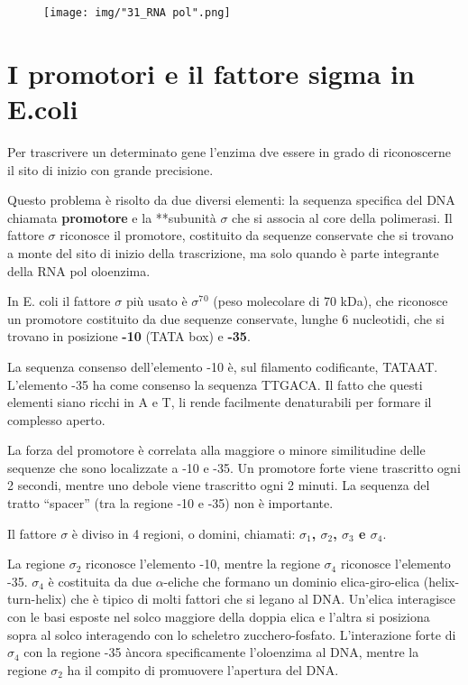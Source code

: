 \documentclass[11pt]{book}
\begin{document}
\begin{figure}[htp]
\centering
\texttt{[image: img/"31\_RNA pol".png]}
\caption{}
\label{rna-pol}
\end{figure}

\section{I promotori e il fattore sigma in
E.coli}\label{i-promotori-e-il-fattore-sigma-in-e.coli}

Per trascrivere un determinato gene l'enzima dve essere in grado di
riconoscerne il sito di inizio con grande precisione.

Questo problema è risolto da due diversi elementi: la sequenza specifica
del DNA chiamata \textbf{promotore} e la **subunità \(\sigma\) che si
associa al core della polimerasi. Il fattore \(\sigma\) riconosce il
promotore, costituito da sequenze conservate che si trovano a monte del
sito di inizio della trascrizione, ma solo quando è parte integrante
della RNA pol oloenzima.

In E. coli il fattore \(\sigma\) più usato è \(\sigma\)\(^7\)\(^0\)
(peso molecolare di 70 kDa), che riconosce un promotore costituito da
due sequenze conservate, lunghe 6 nucleotidi, che si trovano in
posizione \textbf{-10} (TATA box) e \textbf{-35}.

La sequenza consenso dell'elemento -10 è, sul filamento codificante,
TATAAT. L'elemento -35 ha come consenso la sequenza TTGACA. Il fatto che
questi elementi siano ricchi in A e T, li rende facilmente denaturabili
per formare il complesso aperto.

La forza del promotore è correlata alla maggiore o minore similitudine
delle sequenze che sono localizzate a -10 e -35. Un promotore forte
viene trascritto ogni 2 secondi, mentre uno debole viene trascritto ogni
2 minuti. La sequenza del tratto ``spacer'' (tra la regione -10 e -35)
non è importante.

Il fattore \(\sigma\) è diviso in 4 regioni, o domini, chiamati:
\textbf{\(\sigma\)\(_1\), \(\sigma\)\(_2\), \(\sigma\)\(_3\) e
\(\sigma\)\(_4\)}.

La regione \(\sigma\)\(_2\) riconosce l'elemento -10, mentre la regione
\(\sigma\)\(_4\) riconosce l'elemento -35. \(\sigma\)\(_4\) è costituita
da due \(\alpha\)-eliche che formano un dominio elica-giro-elica
(helix-turn-helix) che è tipico di molti fattori che si legano al DNA.
Un'elica interagisce con le basi esposte nel solco maggiore della doppia
elica e l'altra si posiziona sopra al solco interagendo con lo scheletro
zucchero-fosfato. L'interazione forte di \(\sigma\)\(_4\) con la regione
-35 àncora specificamente l'oloenzima al DNA, mentre la regione
\(\sigma\)\(_2\) ha il compito di promuovere l'apertura del DNA.
\end{document}
